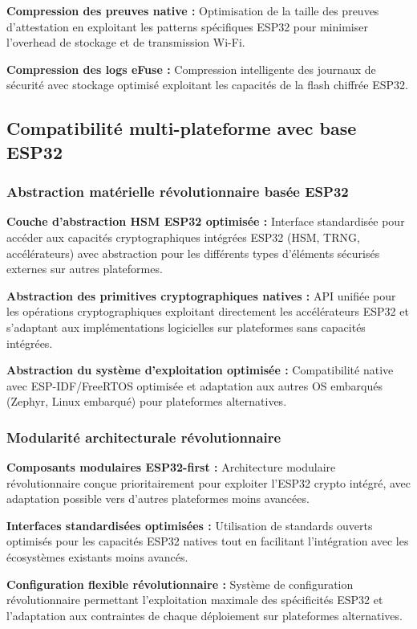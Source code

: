 \begin{algorithm}
\textbf{Compression des preuves native :} Optimisation de la taille des preuves d'attestation en exploitant les patterns spécifiques ESP32 pour minimiser l'overhead de stockage et de transmission Wi-Fi.

\textbf{Compression des logs eFuse :} Compression intelligente des journaux de sécurité avec stockage optimisé exploitant les capacités de la flash chiffrée ESP32.

\subsection{Compatibilité multi-plateforme avec base ESP32}

\subsubsection{Abstraction matérielle révolutionnaire basée ESP32}

\textbf{Couche d'abstraction HSM ESP32 optimisée :} Interface standardisée pour accéder aux capacités cryptographiques intégrées ESP32 (HSM, TRNG, accélérateurs) avec abstraction pour les différents types d'éléments sécurisés externes sur autres plateformes.

\textbf{Abstraction des primitives cryptographiques natives :} API unifiée pour les opérations cryptographiques exploitant directement les accélérateurs ESP32 et s'adaptant aux implémentations logicielles sur plateformes sans capacités intégrées.

\textbf{Abstraction du système d'exploitation optimisée :} Compatibilité native avec ESP-IDF/FreeRTOS optimisée et adaptation aux autres OS embarqués (Zephyr, Linux embarqué) pour plateformes alternatives.

\subsubsection{Modularité architecturale révolutionnaire}

\textbf{Composants modulaires ESP32-first :} Architecture modulaire révolutionnaire conçue prioritairement pour exploiter l'ESP32 crypto intégré, avec adaptation possible vers d'autres plateformes moins avancées.

\textbf{Interfaces standardisées optimisées :} Utilisation de standards ouverts optimisés pour les capacités ESP32 natives tout en facilitant l'intégration avec les écosystèmes existants moins avancés.

\textbf{Configuration flexible révolutionnaire :} Système de configuration révolutionnaire permettant l'exploitation maximale des spécificités ESP32 et l'adaptation aux contraintes de chaque déploiement sur plateformes alternatives.


\end{algorithm}
